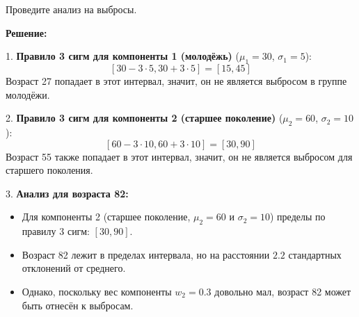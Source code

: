 Проведите анализ на выбросы.

\noindent\textbf{Решение:}

1. \textbf{Правило 3 сигм для компоненты 1 (молодёжь)} ($\mu_1 = 30$, $\sigma_1 = 5$):
\[
    [30 - 3 \cdot 5, 30 + 3 \cdot 5] = [15, 45]
\]
Возраст 27 попадает в этот интервал, значит, он не является выбросом в группе молодёжи.

2. \textbf{Правило 3 сигм для компоненты 2 (старшее поколение)} ($\mu_2 = 60$, $\sigma_2 = 10$):
\[
    [60 - 3 \cdot 10, 60 + 3 \cdot 10] = [30, 90]
\]
Возраст 55 также попадает в этот интервал, значит, он не является выбросом для старшего поколения.

3. \textbf{Анализ для возраста 82:}
\begin{itemize}
    \item Для компоненты 2 (старшее поколение, $\mu_2 = 60$ и $\sigma_2 = 10$) пределы по правилу 3 сигм: $[30, 90]$.
    \item Возраст 82 лежит в пределах интервала, но на расстоянии $2.2$ стандартных отклонений от среднего.
    \item Однако, поскольку вес компоненты $w_2 = 0.3$ довольно мал, возраст 82 может быть отнесён к выбросам.
\end{itemize}

